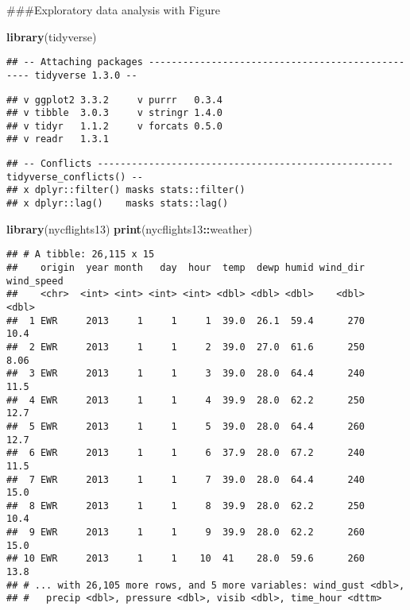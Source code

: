 \documentclass[
]{article}
\newenvironment{Shaded}{\begin{snugshade}}{\end{snugshade}}
\newcommand{\KeywordTok}[1]{\textcolor[rgb]{0.13,0.29,0.53}{\textbf{#1}}}
\newcommand{\NormalTok}[1]{#1}
\newcommand{\OperatorTok}[1]{\textcolor[rgb]{0.81,0.36,0.00}{\textbf{#1}}}
\begin{document}
\#\#\#Exploratory data analysis with Figure

\begin{Shaded}
\begin{Highlighting}[]
\KeywordTok{library}\NormalTok{(tidyverse)}
\end{Highlighting}
\end{Shaded}

\begin{verbatim}
## -- Attaching packages ------------------------------------------------- tidyverse 1.3.0 --
\end{verbatim}

\begin{verbatim}
## v ggplot2 3.3.2     v purrr   0.3.4
## v tibble  3.0.3     v stringr 1.4.0
## v tidyr   1.1.2     v forcats 0.5.0
## v readr   1.3.1
\end{verbatim}

\begin{verbatim}
## -- Conflicts ---------------------------------------------------- tidyverse_conflicts() --
## x dplyr::filter() masks stats::filter()
## x dplyr::lag()    masks stats::lag()
\end{verbatim}

\begin{Shaded}
\begin{Highlighting}[]
\KeywordTok{library}\NormalTok{(nycflights13)}
\KeywordTok{print}\NormalTok{(nycflights13}\OperatorTok{::}\NormalTok{weather) }
\end{Highlighting}
\end{Shaded}

\begin{verbatim}
## # A tibble: 26,115 x 15
##    origin  year month   day  hour  temp  dewp humid wind_dir wind_speed
##    <chr>  <int> <int> <int> <int> <dbl> <dbl> <dbl>    <dbl>      <dbl>
##  1 EWR     2013     1     1     1  39.0  26.1  59.4      270      10.4 
##  2 EWR     2013     1     1     2  39.0  27.0  61.6      250       8.06
##  3 EWR     2013     1     1     3  39.0  28.0  64.4      240      11.5 
##  4 EWR     2013     1     1     4  39.9  28.0  62.2      250      12.7 
##  5 EWR     2013     1     1     5  39.0  28.0  64.4      260      12.7 
##  6 EWR     2013     1     1     6  37.9  28.0  67.2      240      11.5 
##  7 EWR     2013     1     1     7  39.0  28.0  64.4      240      15.0 
##  8 EWR     2013     1     1     8  39.9  28.0  62.2      250      10.4 
##  9 EWR     2013     1     1     9  39.9  28.0  62.2      260      15.0 
## 10 EWR     2013     1     1    10  41    28.0  59.6      260      13.8 
## # ... with 26,105 more rows, and 5 more variables: wind_gust <dbl>,
## #   precip <dbl>, pressure <dbl>, visib <dbl>, time_hour <dttm>
\end{verbatim}
\end{document}
